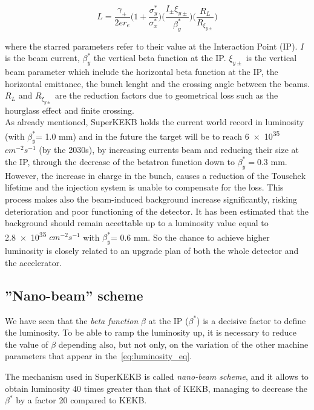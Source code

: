 \begin{equation} \label{eq:luminosity_eq}
L = \frac{\gamma_{\pm}}{2er_{e}} \bigg(1 + \frac{\sigma_{y}^{*}}{\sigma_{x}^{*}} \bigg) \bigg(\frac{I_{\pm}\xi_{y\pm}}{\beta^{*}_{y}} \bigg) \bigg(\frac{R_{L}}{R_{\xi_{y\pm}}} \bigg)
\end{equation}

where the starred parameters refer to their value at the Interaction Point (IP).  $I$ is the beam current, $\beta_{y}^{*}$ the vertical beta function at the IP. $\xi_{y\pm}$ is the vertical beam parameter which include the horizontal beta function at the IP, the horizontal emittance, the bunch lenght and the crossing angle between the beams. $R_{L}$ and $R_{\xi_{y\pm}}$ are the reduction factors due to geometrical loss such as the hourglass effect and finite crossing.\\

As already mentioned, SuperKEKB holds the current world record in luminosity (with $\beta^{*}_{y}$= 1.0 mm) and in the future the target will be to reach \num{6e35} $cm^{-2} s^{-1}$ (by the 2030s), by increasing currents beam and reducing their size at the IP, through the decrease of the betatron function down to $\beta^{*}_{y}= 0.3$ mm. 
However, the increase in charge in the bunch, causes a reduction of the Touschek lifetime and the injection system is unable to compensate for the loss.
This process makes also the beam-induced background increase significantly, risking deterioration and poor functioning of the detector.
It has been estimated that the background should remain accettable up to a luminosity value equal to \num{2.8e35} $cm^{-2} s^{-1}$ with $\beta^{*}_{y}$= 0.6 mm. So the chance to achieve higher luminosity is closely related to an upgrade plan of both the whole detector and the accelerator.


\subsection{''Nano-beam'' scheme} \label{sec:nano_beam}

We have seen that the \textit{beta function} $\beta$ at the IP ($\beta^{*}$) is a decisive factor to define the luminosity. To be able to ramp the luminosity up, it is necessary to reduce the value of $\beta$ depending also, but not only, on the variation of the other machine parameters that appear in the~\autoref{eq:luminosity_eq}.

The mechanism used in SuperKEKB is called \textit{nano-beam scheme}, and it allows to obtain luminosity 40 times greater than that of KEKB, managing to decrease the $\beta^{*}$ by a factor 20 compared to KEKB.\\

